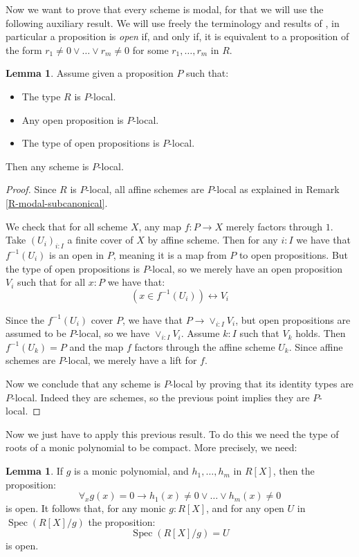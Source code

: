 \documentclass[10pt,a4paper]{article}
\theoremstyle{definition}
\newtheorem{lemma}[theorem]{Lemma}
\DeclareMathOperator{\Spec}{Spec}
\begin{document}
Now we want to prove that every scheme is modal, for that we will use the following auxiliary result. We will use freely the terminology and results of \cite{draft}, in particular a proposition is {\em open}
if, and only if, it is equivalent to a proposition of the form $r_1\neq 0\vee\dots\vee r_m\neq 0$ for some
$r_1,\dots,r_m$ in $R$.

\begin{lemma}\label{scheme-are-sheaf-from-affine}
Assume given a proposition $P$ such that:
\begin{itemize}
\item The type $R$ is $P$-local.
\item Any open proposition is $P$-local.
\item The type of open propositions is $P$-local.
\end{itemize}
Then any scheme is $P$-local.
\end{lemma}

\begin{proof}
Since $R$ is $P$-local, all affine schemes are $P$-local as explained in Remark \ref{R-modal-subcanonical}.

We check that for all scheme $X$, any map $f:P\to X$ merely factors through $1$. Take $(U_i)_{i:I}$ a finite cover of $X$ by affine scheme. Then for any $i:I$ we have that $f^{-1}(U_i)$ is an open in $P$, meaning it is a map from $P$ to open propositions. But the type of open propositions is $P$-local, so we merely have an open proposition $V_i$ such that for all $x:P$ we have that:
\[(x\in f^{-1}(U_i) )\leftrightarrow V_i\]

Since the $f^{-1}(U_i)$ cover $P$, we have that $P\to \lor_{i:I} V_i$, but open propositions are assumed to be $P$-local, so we have $\lor_{i:I} V_i$.
Assume $k:I$ such that $V_k$ holds. Then $f^{-1}(U_k) = P$ and the map $f$ factors through the affine scheme $U_k$. Since affine schemes are $P$-local, we merely have a lift for $f$.

Now we conclude that any scheme is $P$-local by proving that its identity types are $P$-local. Indeed they are schemes, so the previous point implies they are $P$-local.
\end{proof}

Now we just have to apply this previous result. To do this we need the type of roots of a monic polynomial to be compact. More precisely, we need:

\begin{lemma}\label{roots-monic-proper}
  If $g$ is a monic polynomial, and $h_1,\dots,h_m$ in $R[X]$, then the proposition:
  \[
  \forall_xg(x)=0\rightarrow h_1(x)\neq 0\vee\dots\vee h_m(x)\neq 0
  \] 
  is open. It follows that, for any monic $g:R[X]$, and for any open $U$ in $\Spec(R[X]/g)$ the proposition:
  \[\Spec(R[X]/g) = U\]
is open.
\end{lemma}
\end{document}
